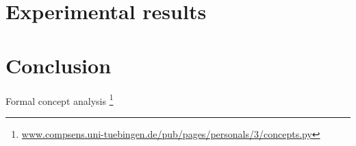 \documentclass[11pt,a4paper]{article}
\begin{document}
\section{Experimental results}

\section{Conclusion}

Formal concept analysis \citet{2010378} \footnote{\url{www.compsens.uni-tuebingen.de/pub/pages/personals/3/concepts.py}}



\end{document}
